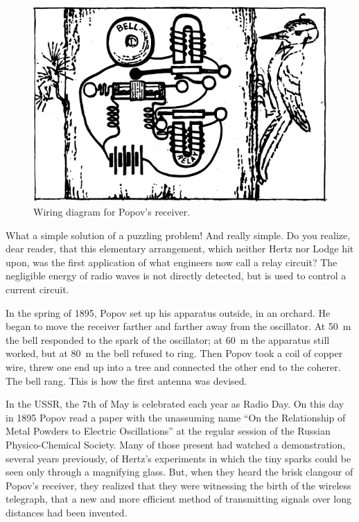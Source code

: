 \begin{figure}[!ht]
\centering
\includegraphics[width=\textwidth]{figures/fig-06-02.pdf}
\caption{Wiring diagram for Popov's receiver.}
\label{fig-6.2}
\end{figure}

What a simple solution of a puzzling problem! And really simple. Do you realize, dear reader, that this elementary arrangement, which neither Hertz nor Lodge hit upon, was the first application of what engineers now call a relay circuit? The negligible energy of radio waves is not directly detected, but is used to control a current circuit.

In the spring of 1895, Popov set up his apparatus outside, in an orchard. He began to move the receiver farther and farther away from the oscillator. At \SI{50}{\meter} the bell responded to the spark of the oscillator; at \SI{60}{\meter} the apparatus still worked, but at \SI{80}{\meter} the bell refused to ring. Then Popov took a coil of copper wire, threw one end up into a tree and connected the other end to the coherer. The bell rang. This is how the first antenna was devised.

In the USSR, the 7th of May is celebrated each year as Radio Day. On this day in 1895 Popov read a paper with the unassuming name ``On the Relationship of Metal Powders to Electric Oscillations'' at the regular session of the Russian Physico-Chemical Society. Many of those present had watched a demonstration, several years previously, of Hertz's experiments in which the tiny sparks could be seen only through a magnifying glass. But, when they heard the brisk clangour of Popov's receiver, they realized that they were witnessing the birth of the wireless telegraph, that a new and more efficient method of transmitting signals over long distances had been invented.

